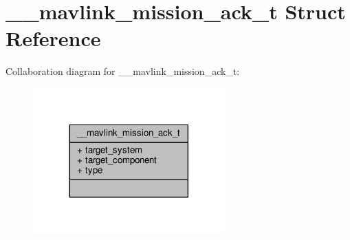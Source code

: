 \hypertarget{struct____mavlink__mission__ack__t}{\section{\+\_\+\+\_\+mavlink\+\_\+mission\+\_\+ack\+\_\+t Struct Reference}
\label{struct____mavlink__mission__ack__t}
}


Collaboration diagram for \+\_\+\+\_\+mavlink\+\_\+mission\+\_\+ack\+\_\+t\+:
\nopagebreak
\begin{figure}[H]
\begin{center}
\leavevmode
\includegraphics[width=209pt]{struct____mavlink__mission__ack__t__coll__graph}
\end{center}
\end{figure}
